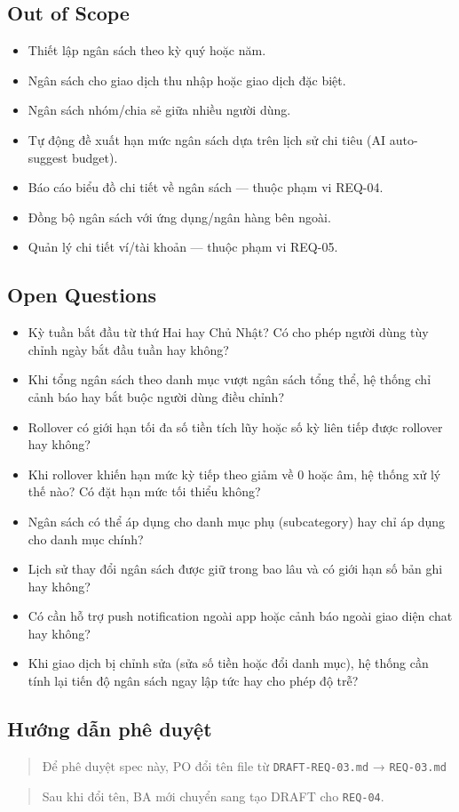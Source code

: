 \subsection{Out of Scope}

\begin{itemize}
\item Thiết lập ngân sách theo kỳ quý hoặc năm.
\item Ngân sách cho giao dịch thu nhập hoặc giao dịch đặc biệt.
\item Ngân sách nhóm/chia sẻ giữa nhiều người dùng.
\item Tự động đề xuất hạn mức ngân sách dựa trên lịch sử chi tiêu (AI auto-suggest budget).
\item Báo cáo biểu đồ chi tiết về ngân sách — thuộc phạm vi REQ-04.
\item Đồng bộ ngân sách với ứng dụng/ngân hàng bên ngoài.
\item Quản lý chi tiết ví/tài khoản — thuộc phạm vi REQ-05.
\end{itemize}
\subsection{Open Questions}

\begin{itemize}
\item [ ] Kỳ tuần bắt đầu từ thứ Hai hay Chủ Nhật? Có cho phép người dùng tùy chỉnh ngày bắt đầu tuần hay không?
\item [ ] Khi tổng ngân sách theo danh mục vượt ngân sách tổng thể, hệ thống chỉ cảnh báo hay bắt buộc người dùng điều chỉnh?
\item [ ] Rollover có giới hạn tối đa số tiền tích lũy hoặc số kỳ liên tiếp được rollover hay không?
\item [ ] Khi rollover khiến hạn mức kỳ tiếp theo giảm về 0 hoặc âm, hệ thống xử lý thế nào? Có đặt hạn mức tối thiểu không?
\item [ ] Ngân sách có thể áp dụng cho danh mục phụ (subcategory) hay chỉ áp dụng cho danh mục chính?
\item [ ] Lịch sử thay đổi ngân sách được giữ trong bao lâu và có giới hạn số bản ghi hay không?
\item [ ] Có cần hỗ trợ push notification ngoài app hoặc cảnh báo ngoài giao diện chat hay không?
\item [ ] Khi giao dịch bị chỉnh sửa (sửa số tiền hoặc đổi danh mục), hệ thống cần tính lại tiến độ ngân sách ngay lập tức hay cho phép độ trễ?
\end{itemize}
\subsection{Hướng dẫn phê duyệt}

\begin{quote}
Để phê duyệt spec này, PO đổi tên file từ \texttt{DRAFT-REQ-03.md} → \texttt{REQ-03.md}
\end{quote}

\begin{quote}
Sau khi đổi tên, BA mới chuyển sang tạo DRAFT cho \texttt{REQ-04}.
\end{quote}
